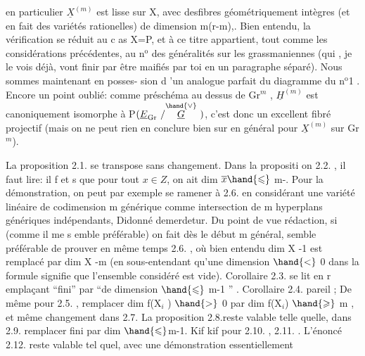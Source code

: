 
en particulier $\underline{X}^{(m)}$ est lisse sur X, avec des\hand{/}fibres géométriquement
intègres (et en fait des variétés rationelles) de dimension m(r-m),. Bien entendu, la
vérification se réduit au c as X=P, et à ce titre appartient, tout
\placedmargin{|}comme les considérations précédentes, au n$^{\text{o}}$ des généralités sur les
grassmaniennes (qui , je le vois déjà, vont finir par être maifiés
par toi en un paragraphe séparé). Nous sommes maintenant en posses-%
sion d 'un analogue parfait du diagramme du n$^{\text{o}}$1 . Encore un point
oublié: comme préschéma au dessus de Gr$^{m}$ , $\underline{H}^{(m)}$ est canoniquement
isomorphe à P$(\underline{E}_{\mathrm{Gr}}\ /\overset{\hand{\vee}}{\underline{G}}\ )$, c'est donc un excellent fibré projectif
(mais on ne peut rien en conclure bien sur en général pour $\underline{X}^{(m)}$ sur
Gr$^{m}$).

La proposition 2.1. se transpose sans changement. Dans la
propositi on 2.2. , il faut lire: il f et s que pour tout $x \in Z$, on
ait  dim $\overline{x} \hand{\leqslant}$ m-. Pour la démonstration, on peut par exemple
se ramener à 2.6. en considérant une  variété linéaire de
codimension m générique comme intersection de m hyperplans génériques
indépendants, Didonné demerdetur. Du point de vue rédaction, si
(comme il me s emble préférable) on fait dès le début m général, 
semble préférable de prouver en même temps 2.6. , où bien entendu
dim X -1 est remplacé par dim X -m (en sous-entendant qu'une dimension
$\hand{<}$ 0 dans la formule signifie que l'ensemble considéré est vide).
Corollaire 2.3. se lit en r emplaçant ``fini'' par ``de dimension $\hand{\leqslant}$ 
m-1 '' . Corollaire 2.4. pareil ; De même pour 2.5. , remplacer
dim f(X$_{i}$ ) $\hand{>}$ 0 par dim f(X$_{i}$) $\hand{\geqslant}$ m , et même changement dans 2.7.
La proposition 2.8.reste valable telle quelle, dans 2.9. remplacer
fini par dim $\hand{\leqslant}$m-1. Kif kif pour 2.10. , 2.11. . L'énoncé
2.12. reste valable tel quel, avec une démonstration essentiellement

